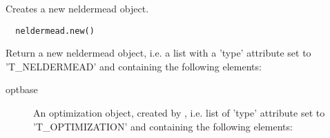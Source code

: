 %
\begin{Description}\relax
Creates a new neldermead object.
\end{Description}
%
\begin{Usage}
\begin{verbatim}
  neldermead.new()
\end{verbatim}
\end{Usage}
%
\begin{Value}
Return a new neldermead object, i.e. a list with a 'type' attribute set to
'T\_NELDERMEAD' and containing the following elements:\begin{description}

\item[optbase] An optimization object, created by ,
i.e. list of 'type' attribute set to 'T\_OPTIMIZATION' and containing
the following elements: \begin{description}


\end{description}
\end{description}
\end{Value}
